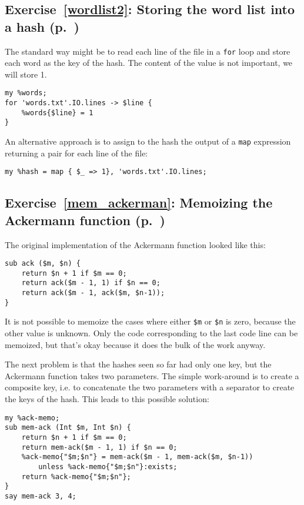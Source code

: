 \subsection{Exercise~\ref{wordlist2}: Storing the word list into a hash (p.~\pageref{wordlist2})}
\label{sol_wordlist2}

The standard way might be to read each line of the file 
in a {\tt for} loop and store each word as the key of the 
hash. The content of the value is not important, we will 
store 1.

\begin{verbatim}
my %words;
for 'words.txt'.IO.lines -> $line {
    %words{$line} = 1
}
\end{verbatim}

An alternative approach is to assign to the hash the 
output of a {\tt map} expression returning a pair for each 
line of the file:

\begin{verbatim}
my %hash = map { $_ => 1}, 'words.txt'.IO.lines;
\end{verbatim}
%

\subsection{Exercise~\ref{mem_ackerman}: Memoizing the Ackermann function (p.~\pageref{mem_ackerman})}
\label{sol_mem_ackerman}

The original implementation of the Ackermann function looked 
like this:

\begin{verbatim}
sub ack ($m, $n) {
    return $n + 1 if $m == 0;
    return ack($m - 1, 1) if $n == 0;
    return ack($m - 1, ack($m, $n-1));
}
\end{verbatim}

It is not possible to memoize the cases where either \verb'$m' 
or \verb'$n' is zero, because the other value is unknown. Only 
the code corresponding to the last code line can be memoized, 
but that's okay because it does the bulk of the work anyway.

The next problem is that the hashes seen so far had only one 
key, but the Ackermann function takes two parameters. The 
simple work-around is to create a composite key, i.e. to 
concatenate the two parameters with a separator to create 
the keys of the hash. This leads to this possible solution:

\begin{verbatim}
my %ack-memo;
sub mem-ack (Int $m, Int $n) {
    return $n + 1 if $m == 0;
    return mem-ack($m - 1, 1) if $n == 0;
    %ack-memo{"$m;$n"} = mem-ack($m - 1, mem-ack($m, $n-1))
        unless %ack-memo{"$m;$n"}:exists;
    return %ack-memo{"$m;$n"};
}
say mem-ack 3, 4;
\end{verbatim} 

